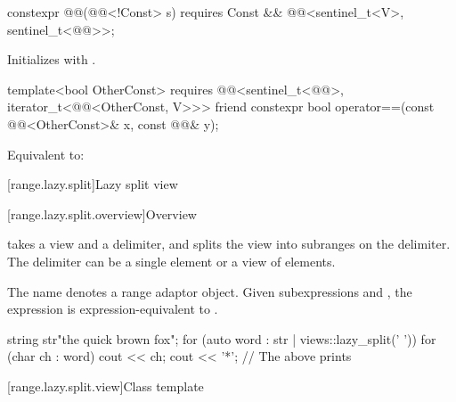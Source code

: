%
\begin{itemdecl}
constexpr @@(@@<!Const> s)
  requires Const && @@<sentinel_t<V>, sentinel_t<@@>>;
\end{itemdecl}

\begin{itemdescr}
\pnum
\effects
Initializes  with .
\end{itemdescr}

%
\begin{itemdecl}
template<bool OtherConst>
  requires @@<sentinel_t<@@>, iterator_t<@@<OtherConst, V>>>
friend constexpr bool operator==(const @@<OtherConst>& x, const @@& y);
\end{itemdecl}

\begin{itemdescr}
\pnum
\effects
Equivalent to: 
\end{itemdescr}

[range.lazy.split]{Lazy split view}

[range.lazy.split.overview]{Overview}

\pnum
{} takes a view and a delimiter, and splits
the view into subranges on the delimiter. The delimiter can be
a single element or a view of elements.

\pnum
{}%
The name  denotes a
range adaptor object.
Given subexpressions  and ,
the expression  is expression-equivalent to
.

\pnum
\begin{example}
\begin{codeblock}
string str{"the quick brown fox"};
for (auto word : str | views::lazy_split(' ')) {
  for (char ch : word)
    cout << ch;
  cout << '*';
}
// The above prints 
\end{codeblock}
\end{example}

[range.lazy.split.view]{Class template }

